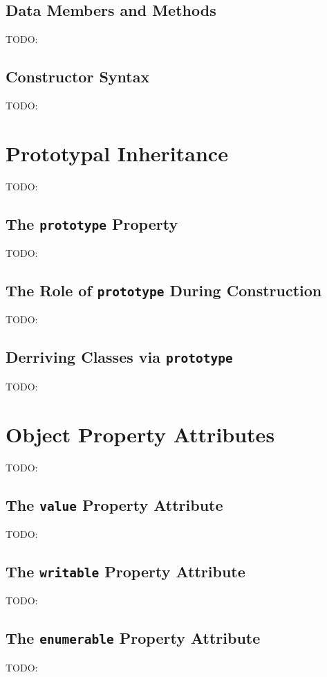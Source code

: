 \documentclass[11pt,letter]{book}
\begin{document}
    \subsection{Data Members and Methods}
    TODO:
    
    \subsection{Constructor Syntax}
    TODO:
    
    \section{Prototypal Inheritance}
    TODO:
    
    \subsection{The \texttt{prototype} Property}
    TODO:
    
    \subsection{The Role of \texttt{prototype} During Construction}
    TODO:
    
    \subsection{Derriving Classes via \texttt{prototype}}
    TODO:
    
    \section{Object Property Attributes}
    TODO:
    
    \subsection{The \texttt{value} Property Attribute}
    TODO:
    
    \subsection{The \texttt{writable} Property Attribute}
    TODO:
    
    \subsection{The \texttt{enumerable} Property Attribute}
    TODO:
    
\end{document}

